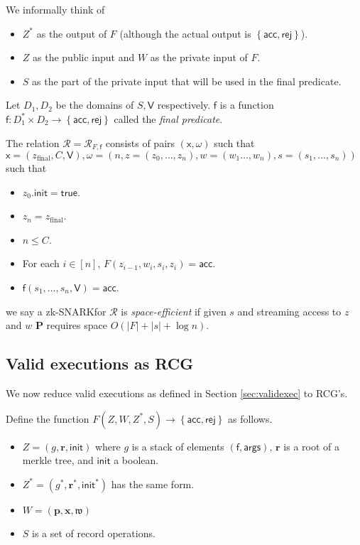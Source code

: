 \documentclass[11pt]{article} %
\newcommand{\rej}{\ensuremath{\mathsf{rej}}\xspace}
\newcommand{\acc}{\ensuremath{\mathsf{acc}}\xspace}
\newcommand{\prv}{\ensuremath{\mathsf{\mathbf{P}}}\xspace}
\newcommand{\inp}{\ensuremath{\mathsf{x}}\xspace}
\newcommand{\wit}{\ensuremath{\omega}\xspace}
\newcommand{\rel}{\ensuremath{\mathcal{R}}\xspace}
\newcommand{\set}[1]{\ensuremath{\left\{#1\right\}}\xspace}
\newcommand{\f}{\ensuremath{\mathsf{f}}\xspace}
\newcommand{\zfin}{\ensuremath{z_{\mathrm{final}}}\xspace}
\newcommand{\init}{\ensuremath{\mathsf{init}}\xspace}
\newcommand{\true}{\ensuremath{\mathsf{true}}\xspace}
\newcommand{\witapp}{\ensuremath{\mathfrak{w}}\xspace}
\newcommand{\instnoops}{\ensuremath{\mathbf{x}}\xspace}
\renewcommand{\path}{\ensuremath{\mathbf{p}}\xspace}
\renewcommand{\root}{\ensuremath{\mathbf{r}}\xspace}
\newcommand{\args}{\ensuremath{\mathsf{args}}\xspace}
\newcommand{\recset}{\ensuremath{\mathsf{V}}\xspace}
\newcommand{\finpred}{\ensuremath{\mathsf{f}}\xspace}
\newcommand{\zksnark}{zk-SNARK\;}
\begin{document}
We informally think of 
\begin{itemize}
\item $Z^*$ as the output of $F$ (although the actual output is \set{\acc,\rej}).

\item $Z$ as the public input and $W$ as the private input of $F$.
\item $S$ as the part of the private input that will be used in the final predicate.
% 
\end{itemize}

Let $D_1,D_2$ be the domains of $S,\recset$ respectively. \finpred is a function
$\finpred:D_1^*\times D_2 \to \set{\acc,\rej}$ called the \emph{final predicate}.

The relation $\rel=\rel_{F,\finpred}$ consists of pairs $(\inp,\wit)$ such that
$\inp=(\zfin,C,\recset),\wit=(n,z=(z_0,\ldots,z_n),w=(w_1\ldots,w_n),s=(s_1,\ldots,s_n))$ such that
\begin{itemize}
 \item $z_0.\init = \true$.
 \item $z_n=\zfin$.
 \item $n\leq C$.
 \item For each $i\in [n]$, $F(z_{i-1},w_i,s_i,z_i)=\acc$.
 \item $\finpred(s_1,\ldots,s_n,\recset)=\acc$.
\end{itemize}


we say a \zksnark for \rel is \emph{space-efficient} if given $s$ and streaming access
to $z$ and $w$ \prv requires space $O(|F|+|s|+\log n)$.


\subsection{Valid executions as RCG}
We now reduce valid executions as defined in Section \ref{sec:validexec} to RCG's.

Define the function $F(Z,W,Z^*,S)\to \set{\acc,\rej}$ as follows.
\begin{itemize}
 \item $Z=(g,\root,\init)$ where $g$ is a stack of elements $(\f,\args)$, \root is a root of a merkle tree, and \init a boolean.
 \item $Z^*=(g^*,\root^*,\init^*)$ has the same form.
 \item $W=(\path,\instnoops,\witapp)$
 \item $S$ is a set of record operations.
\end{itemize}
\end{document}
